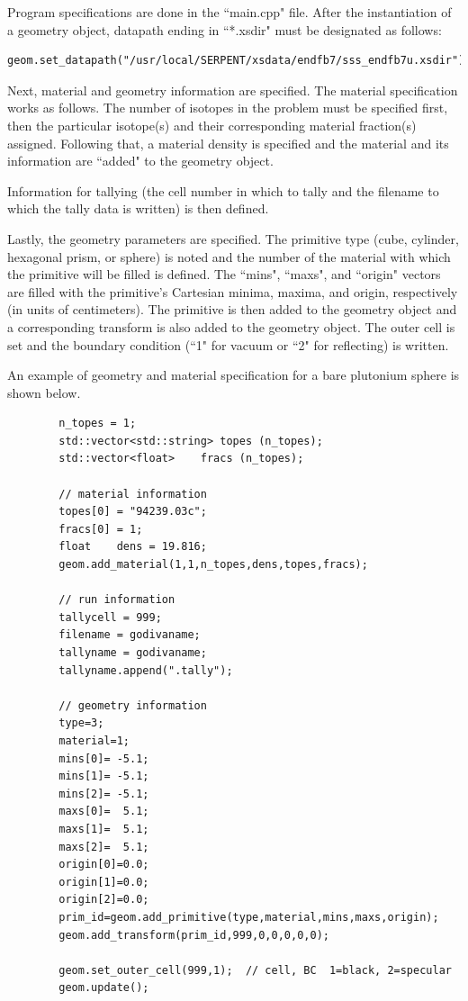 \documentclass[twoside,a4paper]{refart}
\begin{document}
Program specifications are done in the ``main.cpp" file. After the instantiation of a geometry object, 
datapath ending in ``*.xsdir" must be designated as follows:

\begin{verbatim}
geom.set_datapath("/usr/local/SERPENT/xsdata/endfb7/sss_endfb7u.xsdir");
\end{verbatim}

Next, material and geometry information are specified. The material specification works as follows. The 
number of isotopes in the problem must be specified first, then the particular isotope(s) and their 
corresponding material fraction(s) assigned. Following that, a material density is specified and the 
material and its information are ``added" to the geometry object.

Information for tallying (the cell number in which to tally and the filename to which the tally data is written) is then defined.

Lastly, the geometry parameters are specified. The primitive type (cube, cylinder, hexagonal prism, or sphere) is noted and the number of the material with which the primitive will be filled is defined. The 
``mins", ``maxs", and ``origin" vectors are filled with the primitive's Cartesian minima, maxima, and origin, respectively (in units of centimeters). The primitive is then added to the geometry object and a corresponding transform is also added to the geometry object. The outer cell is set and the boundary
condition (``1" for vacuum or ``2" for reflecting) is written.

An example of geometry and material specification for a bare plutonium sphere is shown below.

\begin{verbatim}
		n_topes = 1;
		std::vector<std::string> topes (n_topes);
		std::vector<float>    fracs (n_topes);

		// material information
		topes[0] = "94239.03c";
		fracs[0] = 1;      
		float    dens = 19.816;
		geom.add_material(1,1,n_topes,dens,topes,fracs);
		
		// run information
		tallycell = 999;
		filename = godivaname;
		tallyname = godivaname;
		tallyname.append(".tally");
	
		// geometry information
		type=3;
		material=1;
		mins[0]= -5.1;
		mins[1]= -5.1;
		mins[2]= -5.1;
		maxs[0]=  5.1;
		maxs[1]=  5.1;
		maxs[2]=  5.1;
		origin[0]=0.0;
		origin[1]=0.0;
		origin[2]=0.0;
		prim_id=geom.add_primitive(type,material,mins,maxs,origin);
		geom.add_transform(prim_id,999,0,0,0,0,0);

		geom.set_outer_cell(999,1);  // cell, BC  1=black, 2=specular
		geom.update();
\end{verbatim}
\end{document}
